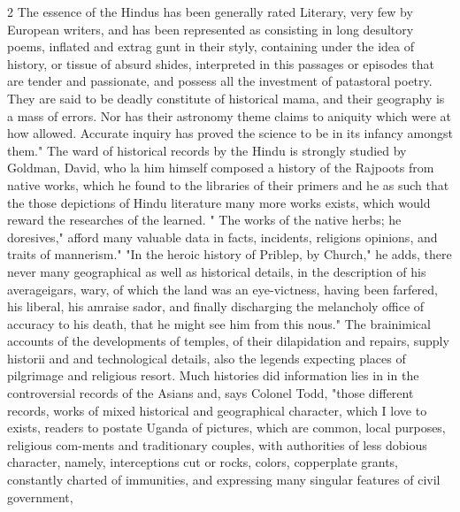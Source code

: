\documentclass[10pt]{article}
\begin{document}
\begin{multicols}{2}
The essence of the Hindus has been generally rated Literary, very few by European writers, and has been represented as consisting in long desultory poems, inflated and extrag gunt in their styly, containing under the idea of history, or tissue of absurd shides, interpreted in this passages or episodes that are tender and passionate, and possess all the investment of patastoral poetry. They are said to be deadly constitute of historical mama, and their geography is a mass of errors. Nor has their astronomy theme claims to aniquity which were at how allowed. Accurate inquiry has proved the science to be in its infancy amongst them." The ward of historical records by the Hindu is strongly studied by Goldman, David, who la him himself composed a history of the Rajpoots from native works, which he found to the libraries of their primers and he as such that the those depictions of Hindu literature many more works exists, which would reward the researches of the learned. " The works of the native herbs; he doresives," afford many valuable data in facts, incidents, religions opinions, and traits of mannerism." "In the heroic history of Priblep, by Church," he adds, there never many geographical as well as historical details, in the description of his averageigars, wary, of which the land was an eye-victness, having been farfered, his liberal, his amraise sador, and finally discharging the melancholy office of accuracy to his death, that he might see him from this nous." The brainimical accounts of the developments of temples, of their dilapidation and repairs, supply historii and and technological details, also the legends expecting places of pilgrimage and religious resort. Much histories did information lies in in the controversial records of the Asians and, says Colonel Todd, "those different records, works of mixed historical and geographical character, which I love to exists, readers to postate Uganda of pictures, which are common, local purposes, religious com-ments and traditionary couples, with authorities of less dobious character, namely, interceptions cut or rocks, colors, copperplate grants, constantly charted of immunities, and expressing many singular features of civil government,

\end{multicols}
\end{document}
